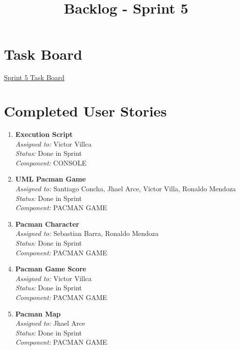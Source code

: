     \title{Backlog - Sprint 5}
    \author{}
    \date{}
    \maketitle

    \section*{Task Board}
    \href{https://tree.taiga.io/project/joseluis-teran-coffeetime/taskboard/sprint-5-3817}{Sprint 5 Task Board}

    \section*{Completed User Stories}

    \begin{enumerate}
        \item \textbf{Execution Script} \\
        \textit{Assigned to:} Victor Villca \\
        \textit{Status:} Done in Sprint \\
        \textit{Component:} CONSOLE
        \item \textbf{UML Pacman Game} \\
        \textit{Assigned to:} Santiago Concha, Jhael Arce, Victor Villa, Ronaldo Mendoza \\
        \textit{Status:} Done in Sprint \\
        \textit{Component:} PACMAN GAME
        \item \textbf{Pacman Character} \\
        \textit{Assigned to:} Sebastian Barra, Ronaldo Mendoza \\
        \textit{Status:} Done in Sprint \\
        \textit{Component:} PACMAN GAME
        \item \textbf{Pacman Game Score} \\
        \textit{Assigned to:} Victor Villca \\
        \textit{Status:} Done in Sprint \\
        \textit{Component:} PACMAN GAME
        \item \textbf{Pacman Map} \\
        \textit{Assigned to:} Jhael Arce  \\
        \textit{Status:} Done in Sprint \\
        \textit{Component:} PACMAN GAME
    \end{enumerate}

